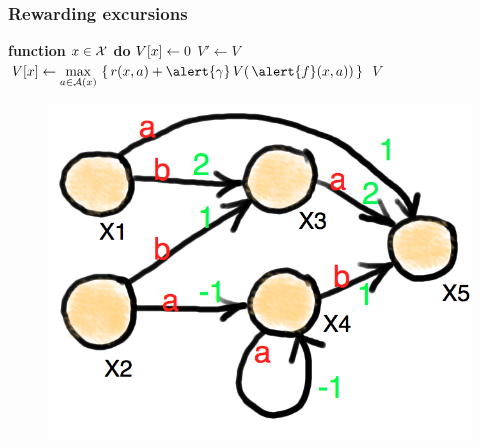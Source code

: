 \begin{frame}
\frametitle{Rewarding excursions}

  \bcol[t]
  \col[0.7\textwidth]
        \begin{algorithmic}[1]
	        \Statex \mbox{} \hspace*{-2em} {\bf function}  
		 $x\in\mathcal{X}$ {\bf do} $V[x] \gets 0$
		\State $V' \gets V$
		\Repeat
			\For{$\st\in\States\setminus\{\st^*\}$}
				\State \hspace*{-0.1in} $V[\st] \gets  \displaystyle\max_{\action\in \Actions(\st)}\,\left\{\, \rewardfun(\st,\action) + \alert{\gamma}\,
					V(\, \alert{f}(\st,\action)) \,\right\}$
			\EndFor
		\State \Return $V$
	\end{algorithmic}
	\col[0.3\textwidth]
	\begin{figure}[tb]
		\begin{center}
		\vspace*{-0.4in}
		\hspace*{-0.4in}
		\includegraphics[width=1.2\textwidth]{Figures/graph02.png}
		\end{center}
	\end{figure}	
  \ecol

	\bigskip
	\bigskip
	
	\bcol
	\col[0.7\textwidth]
	\col[0.3\textwidth]
	\ecol


\end{frame}
